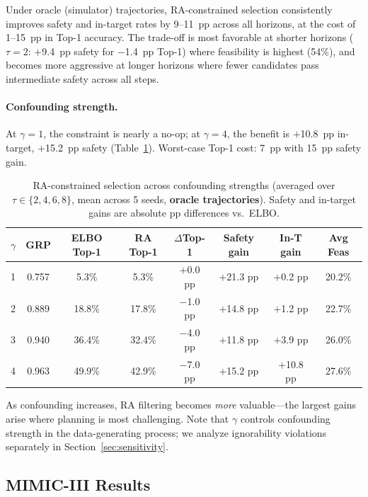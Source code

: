\documentclass{article}
\begin{document}
Under oracle (simulator) trajectories, RA-constrained selection consistently improves safety and in-target rates by 9--11~pp across all horizons, at the cost of 1--15~pp in Top-1 accuracy. The trade-off is most favorable at shorter horizons ($\tau = 2$: $+$9.4~pp safety for $-$1.4~pp Top-1) where feasibility is highest (54\%), and becomes more aggressive at longer horizons where fewer candidates pass intermediate safety across all steps.

\vspace{-0.8em}
\paragraph{Confounding strength.} At $\gamma = 1$, the constraint is nearly a no-op; at $\gamma = 4$, the benefit is $+$10.8~pp in-target, $+$15.2~pp safety (Table~\ref{tab:gamma_sweep}). Worst-case Top-1 cost: 7~pp with 15~pp safety gain.

\begin{table}[t]
\centering
\caption{RA-constrained selection across confounding strengths (averaged over $\tau \in \{2,4,6,8\}$, mean across 5 seeds, \textbf{oracle trajectories}). Safety and in-target gains are absolute pp differences vs.\ ELBO.}
\label{tab:gamma_sweep}
\small
\begin{tabular}{l c c c c c c c}
\toprule
$\gamma$ & GRP & ELBO Top-1 & RA Top-1 & $\Delta$Top-1 & Safety gain & In-T gain & Avg Feas \\
\midrule
1 & 0.757 & 5.3\% & 5.3\% & $+$0.0 pp & $+$21.3 pp & $+$0.2 pp & 20.2\% \\
2 & 0.889 & 18.8\% & 17.8\% & $-$1.0 pp & $+$14.8 pp & $+$1.2 pp & 22.7\% \\
3 & 0.940 & 36.4\% & 32.4\% & $-$4.0 pp & $+$11.8 pp & $+$3.9 pp & 26.0\% \\
4 & 0.963 & 49.9\% & 42.9\% & $-$7.0 pp & $+$15.2 pp & $+$10.8 pp & 27.6\% \\
\bottomrule
\end{tabular}
\end{table}

As confounding increases, RA filtering becomes \emph{more} valuable---the largest gains arise where planning is most challenging. Note that $\gamma$ controls confounding strength in the data-generating process; we analyze ignorability violations separately in Section~\ref{sec:sensitivity}.


\subsection{MIMIC-III Results}
\label{sec:mimic_results}
\end{document}
